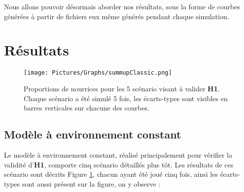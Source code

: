 		Nous allons pouvoir désormais aborder nos résultats, sous la forme de courbes générées à partir de fichiers eux même générés pendant chaque simulation. 
		
			
			
	\section{Résultats}
	
	\begin{figure}
	\centering
	\texttt{[image: Pictures/Graphs/summupClassic.png]}
	\caption{Proportions de nourrices pour les 5 scénario visant à valider \textbf{H1}. Chaque scénario a été simulé 5 fois, les écarts-types sont visibles en barres verticales sur chacune des courbes.}
	\label{envConstant}
	\end{figure}
	
	\subsection{Modèle à environnement constant}
	
	Le modèle à environnement constant, réalisé principalement pour vérifier la validité d'\textbf{H1}, comporte cinq scénario détaillés plus tôt. Les résultats de ces scénario sont décrits Figure \ref{envConstant}, chacun ayant été joué cinq fois, ainsi les écarts-types sont aussi présent sur la figure, on y observe :
	
